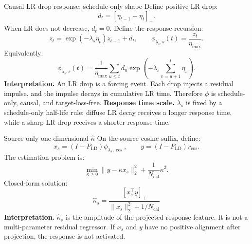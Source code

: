 \documentclass[9pt,aspectratio=169]{beamer}
\begin{document}
\begin{frame}{Causal LR-drop response: schedule-only shape}
\small
Define positive LR drop:
\[
d_t=[\eta_{t-1}-\eta_t]_+.
\]
When LR does not decrease, \(d_t=0\).
\vfill
Define the response recursion:
\[
z_t=\exp(-\lambda_s\eta_t)z_{t-1}+d_t,
\qquad
\phi_{\lambda_s,s}(t)=\frac{z_t}{\eta_{\max}}.
\]
Equivalently:
\[
\phi_{\lambda_s,s}(t)
=
\frac{1}{\eta_{\max}}
\sum_{u\le t}
d_u
\exp\left(
-\lambda_s\sum_{v=u+1}^{t}\eta_v
\right).
\]
\vfill
\textbf{Interpretation.}
An LR drop is a forcing event.
Each drop injects a residual impulse, and the impulse decays in cumulative LR time.
Therefore \(\phi\) is schedule-only, causal, and target-loss-free.
\vfill
\textbf{Response time scale.}
\(\lambda_s\) is fixed by a schedule-only half-life rule:
diffuse LR decay receives a longer response time,
while a sharp LR drop receives a shorter response time.
\end{frame}

\begin{frame}{Source-only one-dimensional \(\widehat\kappa\)}
\small
On the source cosine suffix, define:
\[
x_s=(I-P_{\mathrm{LD}})\phi_{\lambda_s,\cos},
\qquad
y=(I-P_{\mathrm{LD}})r_{\cos}.
\]
The estimation problem is:
\[
\min_{\kappa\ge0}
\|y-\kappa x_s\|_2^2+\frac{1}{N_{\mathrm{cal}}}\kappa^2.
\]
Closed-form solution:
\[
\boxed{
\widehat\kappa_s
=
\frac{[x_s^\top y]_+}
{\|x_s\|_2^2+1/N_{\mathrm{cal}}}
}
\]
\vfill
\textbf{Interpretation.}
\(\widehat\kappa_s\) is the amplitude of the projected response feature.
It is not a multi-parameter residual regressor.
If \(x_s\) and \(y\) have no positive alignment after projection,
the response is not activated.
\end{frame}
\end{document}
